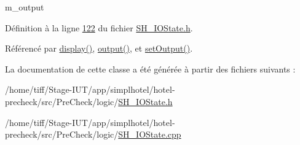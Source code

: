 m\-\_\-output 



Définition à la ligne \hyperlink{SH__IOState_8h_source_l00122}{122} du fichier \hyperlink{SH__IOState_8h_source}{S\-H\-\_\-\-I\-O\-State.\-h}.



Référencé par \hyperlink{classSimpleHotel_1_1SH__InOutState_a1cbe5befe4f42e0941165498ed0117a9}{display()}, \hyperlink{classSimpleHotel_1_1SH__InOutState_a71b15e4d49b9c2aa540500065ceb39da}{output()}, et \hyperlink{classSimpleHotel_1_1SH__InOutState_a5e151d7b01cceb6766b6d83d4a9ac1aa}{set\-Output()}.



La documentation de cette classe a été générée à partir des fichiers suivants \-:\begin{DoxyCompactItemize}
\item 
/home/tiff/\-Stage-\/\-I\-U\-T/app/simplhotel/hotel-\/precheck/src/\-Pre\-Check/logic/\hyperlink{SH__IOState_8h}{S\-H\-\_\-\-I\-O\-State.\-h}\item 
/home/tiff/\-Stage-\/\-I\-U\-T/app/simplhotel/hotel-\/precheck/src/\-Pre\-Check/logic/\hyperlink{SH__IOState_8cpp}{S\-H\-\_\-\-I\-O\-State.\-cpp}\end{DoxyCompactItemize}
